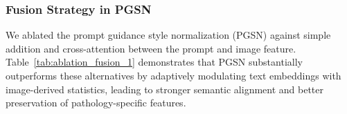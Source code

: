 \documentclass[journal,twoside,web]{ieeecolor}
\newcommand{\revision}[1]{\textcolor{revisioncolor}{#1}}  %
\renewcommand{\revision}[1]{#1}%
\begin{document}
\subsubsection{Fusion Strategy in PGSN}
{We ablated the prompt guidance style normalization (PGSN) against simple addition and cross-attention between the prompt and image feature. Table~\ref{tab:ablation_fusion_1} demonstrates that PGSN substantially outperforms these alternatives by adaptively modulating text embeddings with image-derived statistics, leading to stronger semantic alignment and better preservation of pathology-specific features.}







\begin{table}[!htbp]
  \centering
  \setlength\tabcolsep{2pt}
  \renewcommand{\arraystretch}{1.0}
  \caption{\revision{ABLATION STUDY OF FUSION MECHANISM ON MIST DATASET. THE BEST SCORES ARE HIGHLIGHTED IN BOLD.}}
  \label{tab:ablation_fusion_1}

\end{table}


\end{document}
